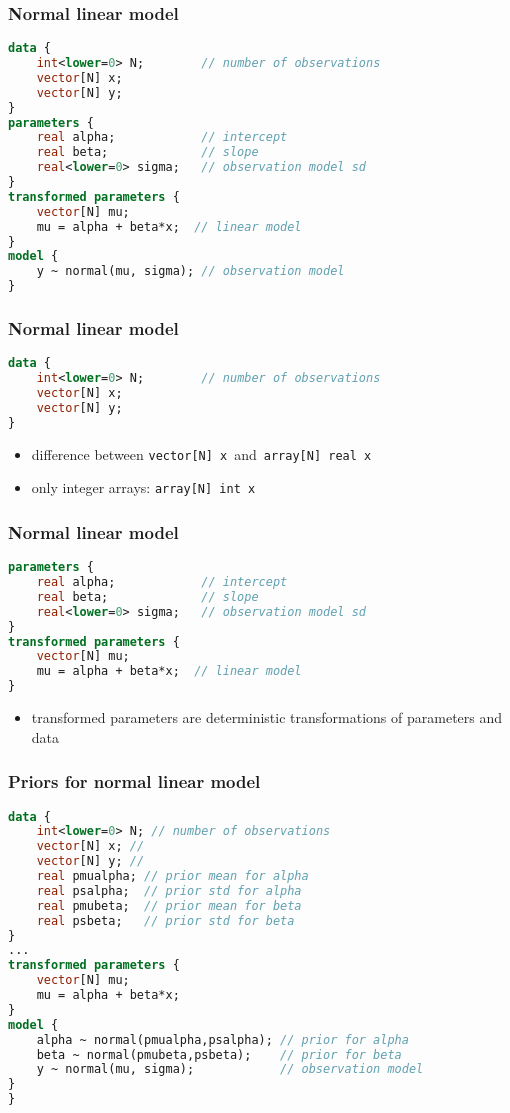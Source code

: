 \documentclass[finnish,english,t]{beamer}
\begin{document}
\begin{frame}[fragile]
  \frametitle{Normal linear model}
  {\small
  \begin{lstlisting}[language=Stan]
data {
    int<lower=0> N;        // number of observations
    vector[N] x; 
    vector[N] y;  
}
parameters {
    real alpha;            // intercept
    real beta;             // slope
    real<lower=0> sigma;   // observation model sd
}
transformed parameters {
    vector[N] mu;
    mu = alpha + beta*x;  // linear model
}
model {
    y ~ normal(mu, sigma); // observation model
}
  \end{lstlisting}
}
\end{frame} 

\begin{frame}[fragile]
  \frametitle{Normal linear model}
  {\small
  \begin{lstlisting}[language=Stan]
data {
    int<lower=0> N;        // number of observations
    vector[N] x; 
    vector[N] y;  
}
\end{lstlisting}
  }

  \begin{itemize}
  \item difference between {\small\tt vector[N] x}\, and\, {\small\tt array[N] real x}
  \item<2-> only integer arrays: {\small\tt array[N] int x}
  \end{itemize}
\end{frame}

\begin{frame}[fragile]
  \frametitle{Normal linear model}
  {\small
  \begin{lstlisting}[language=Stan]
parameters {
    real alpha;            // intercept
    real beta;             // slope
    real<lower=0> sigma;   // observation model sd
}
transformed parameters {
    vector[N] mu;
    mu = alpha + beta*x;  // linear model
}
\end{lstlisting}
  }
  \begin{itemize}
  \item transformed parameters are deterministic transformations of parameters and data
  \end{itemize}
\end{frame} 

\begin{frame}[fragile]
  \frametitle{Priors for normal linear model}
  {\small
  \begin{lstlisting}[language=Stan]
data {
    int<lower=0> N; // number of observations 
    vector[N] x; // 
    vector[N] y; // 
    real pmualpha; // prior mean for alpha
    real psalpha;  // prior std for alpha
    real pmubeta;  // prior mean for beta
    real psbeta;   // prior std for beta
}
...
transformed parameters {
    vector[N] mu;
    mu = alpha + beta*x;
}
model {
    alpha ~ normal(pmualpha,psalpha); // prior for alpha
    beta ~ normal(pmubeta,psbeta);    // prior for beta
    y ~ normal(mu, sigma);            // observation model
}
}
  \end{lstlisting}
}
\end{frame} 
\end{document}

